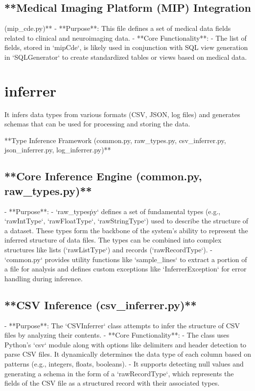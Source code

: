 \documentclass[sigconf,natbib=false]{acmart}
\begin{document}
\begin{draft}
\subsection{**Medical Imaging Platform (MIP) Integration}(mip_cde.py)**
   - **Purpose**: This file defines a set of medical data fields related to clinical and neuroimaging data.
   - **Core Functionality**: 
     - The list of fields, stored in `mipCde`, is likely used in conjunction with SQL view generation in `SQLGenerator` to create standardized tables or views based on medical data.


\section{inferrer}
It infers data types from various formats (CSV, JSON, log files) and generates schemas that can be used for processing and storing the data.

 **Type Inference Framework (common.py, raw_types.py, csv_inferrer.py, json_inferrer.py, log_inferrer.py)**
\subsection{**Core Inference Engine (common.py, raw_types.py)**}
   - **Purpose**: 
     - `raw_types\.py` defines a set of fundamental types (e.g., `rawIntType`, `rawFloatType`, `rawStringType`) used to describe the structure of a dataset. These types form the backbone of the system's ability to represent the inferred structure of data files. The types can be combined into complex structures like lists (`rawListType`) and records (`rawRecordType`).
     - `common.py` provides utility functions like `sample_lines` to extract a portion of a file for analysis and defines custom exceptions like `InferrerException` for error handling during inference.

\subsection{ **CSV Inference (csv_inferrer.py)**}
   - **Purpose**: The `CSVInferrer` class attempts to infer the structure of CSV files by analyzing their contents.
   - **Core Functionality**:
     - The class uses Python's `csv` module along with options like delimiters and header detection to parse CSV files. It dynamically determines the data type of each column based on patterns (e.g., integers, floats, booleans).
     - It supports detecting null values and generating a schema in the form of a `rawRecordType`, which represents the fields of the CSV file as a structured record with their associated types.


\end{draft}
\end{document}
